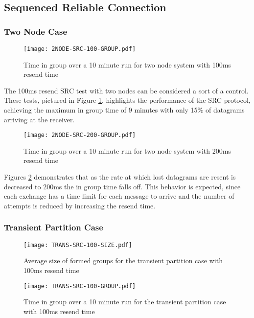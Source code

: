 \subsection{Sequenced Reliable Connection}

\subsubsection{Two Node Case}

\begin{figure}[!h]
\centering
\texttt{[image: 2NODE-SRC-100-GROUP.pdf]}
\caption{Time in group over a 10 minute run for two node system with 100ms resend time}
\label{fig:IGT-SRC-2NODE-100}
\end{figure}

The 100ms resend SRC test with two nodes can be considered a sort of a control.
These tests, pictured in Figure \ref{fig:IGT-SRC-2NODE-100}, highlights the performance of the
SRC protocol, achieving the maximum in group time of 9 minutes with only 15\%
of datagrams arriving at the receiver. 

\begin{figure}[!h]
\centering
\texttt{[image: 2NODE-SRC-200-GROUP.pdf]}
\caption{Time in group over a 10 minute run for two node system with 200ms resend time}
\label{fig:IGT-SRC-2NODE-200}
\end{figure}

Figures \ref{fig:IGT-SRC-2NODE-200} demonstrates that as the
rate at which lost datagrams are resent is decreased to 200ms the
in group time falls off. This behavior is expected, since each exchange has a
time limit for each message to arrive and the number of attempts is reduced by
increasing the resend time.


\subsubsection{Transient Partition Case}

\begin{figure}[!h]
\centering
\texttt{[image: TRANS-SRC-100-SIZE.pdf]}
\caption{Average size of formed groups for the transient partition case with 100ms resend time}
\label{fig:MGS-SRC-TRANS-100}
\end{figure}

\begin{figure}[!h]
\centering
\texttt{[image: TRANS-SRC-100-GROUP.pdf]}
\caption{Time in group over a 10 minute run for the transient partition case with 100ms resend time}
\label{fig:IGT-SRC-TRANS-100}
\end{figure}


